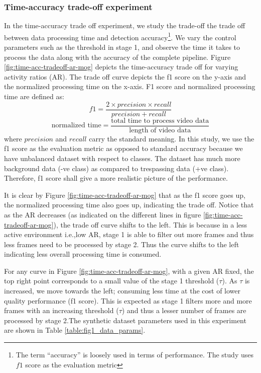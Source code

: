 \subsubsection{Time-accuracy trade-off experiment}
In the time-accuracy trade off experiment, we study the trade-off the trade off between data processing time and detection accuracy\footnote{The term ``accuracy'' is loosely used in terms of performance. The study uses $f1$ score as the evaluation metric}. We vary the control parameters such as the threshold in stage 1, and observe the time it takes to process the data along with the accuracy of the complete pipeline. Figure \ref{fig:time-acc-tradeoff-ar-mog} depicts the time-accuracy trade off for varying activity ratios (AR). The trade off curve depicts the f1 score on the y-axis and the normalized processing time on the x-axis. F1 score and normalized processing time are defined as: 
$$ f1 = \frac{2 \times precision \times recall}{precision + recall}$$
$$\text{normalized time} = \frac{\text{total time to process video data}}{\text{length of video data}}$$
where $precision$ and $recall$ carry the standard meaning. In this study, we use the f1 score as the evaluation metric as opposed to standard accuracy because we have unbalanced dataset with respect to classes. The dataset has much more background data (-ve class) as compared to trespassing data (+ve class). Therefore, f1 score shall give a more realistic picture of the performance. 

It is clear by Figure \ref{fig:time-acc-tradeoff-ar-mog} that as the f1 score goes up, the normalized processing time also goes up, indicating the trade off. Notice that as the AR decreases (as indicated on the different lines in figure \ref{fig:time-acc-tradeoff-ar-mog}), the trade off curve shifts to the left. This is because in a less active environment i.e.,low AR, stage 1 is able to filter out more frames and thus less frames need to be processed by stage 2. Thus the curve shifts to the left indicating less overall processing time is consumed.   

For any curve in Figure \ref{fig:time-acc-tradeoff-ar-mog}, with a given AR fixed, the top right point corresponds to a small value of the stage 1 threshold ($\tau$). As $\tau$ is increased, we move towards the left; consuming less time at the cost of lower quality performance (f1 score). This is expected as stage 1 filters more and more frames with an increasing threshold ($\tau$) and thus a lesser number of frames are processed by stage 2.The synthetic dataset parameters used in this experiment are shown in Table \ref{table:fig1_data_params}. 

